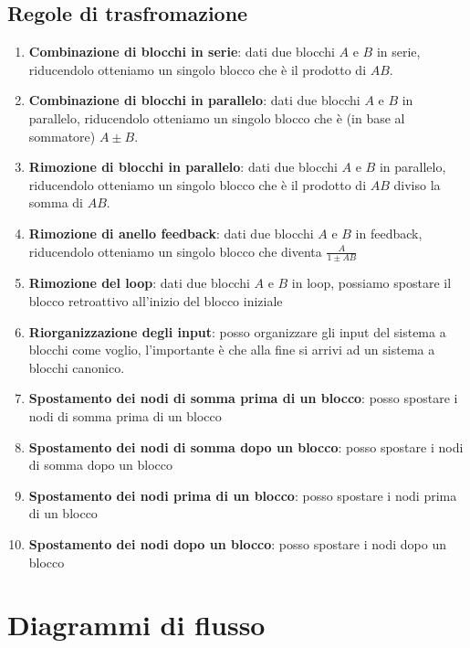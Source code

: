 \documentclass[a4paper]{article}
\begin{document}
\subsection{Regole di trasfromazione}

\begin{enumerate}
    \item \textbf{Combinazione di blocchi in serie}: dati due blocchi $A$ e $B$ in serie, riducendolo otteniamo un singolo blocco che è il prodotto di $AB$.
    \item \textbf{Combinazione di blocchi in parallelo}: dati due blocchi $A$ e $B$ in parallelo, riducendolo otteniamo un singolo blocco che è (in base al sommatore) $A\pm B$.
    \item \textbf{Rimozione di blocchi in parallelo}: dati due blocchi $A$ e $B$ in parallelo, riducendolo otteniamo un singolo blocco che è il prodotto di $AB$ diviso la somma di $AB$.
    \item \textbf{Rimozione di anello feedback}: dati due blocchi $A$ e $B$ in feedback, riducendolo otteniamo un singolo blocco che diventa $\frac{A}{1 \pm AB}$
    \item \textbf{Rimozione del loop}: dati due blocchi $A$ e $B$ in loop, possiamo spostare il blocco retroattivo all'inizio del blocco iniziale
    \item \textbf{Riorganizzazione degli input}: posso organizzare gli input del sistema a blocchi come voglio, l'importante è che alla fine si arrivi ad un sistema a blocchi canonico.
    \item \textbf{Spostamento dei nodi di somma prima di un blocco}: posso spostare i nodi di somma prima di un blocco
    \item \textbf{Spostamento dei nodi di somma dopo un blocco}: posso spostare i nodi di somma dopo un blocco
    \item \textbf{Spostamento dei nodi prima di un blocco}: posso spostare i nodi prima di un blocco
    \item \textbf{Spostamento dei nodi dopo un blocco}: posso spostare i nodi dopo un blocco
\end{enumerate}

\section{Diagrammi di flusso}
\end{document}
